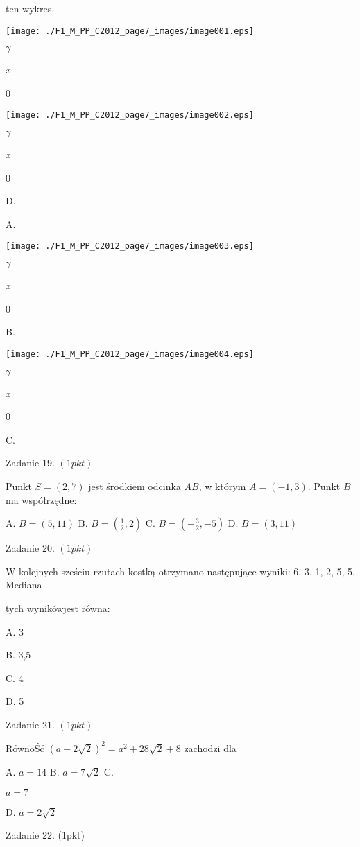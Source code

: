 \documentclass[a4paper,12pt]{article}
\begin{document}
ten wykres.
\begin{center}
\texttt{[image: ./F1\_M\_PP\_C2012\_page7\_images/image001.eps]}
\end{center}
$\gamma$

{\it x}

0
\begin{center}
\texttt{[image: ./F1\_M\_PP\_C2012\_page7\_images/image002.eps]}
\end{center}
$\gamma$

{\it x}

0

D.

A.
\begin{center}
\texttt{[image: ./F1\_M\_PP\_C2012\_page7\_images/image003.eps]}
\end{center}
$\gamma$

{\it x}

0

B.
\begin{center}
\texttt{[image: ./F1\_M\_PP\_C2012\_page7\_images/image004.eps]}
\end{center}
$\gamma$

{\it x}

0

C.

Zadanie 19. $(1pkt)$

Punkt $S=(2,7)$ jest środkiem odcinka $AB$, w którym $A=(-1,3)$. Punkt $B$ ma współrzędne:

A. $B=(5,11)$ B. $B=(\displaystyle \frac{1}{2},2)$ C. $B=(-\displaystyle \frac{3}{2},-5)$ D. $B=(3,11)$

Zadanie 20. $(1pkt)$

$\mathrm{W}$ kolejnych sześciu rzutach kostką otrzymano następujące wyniki: 6, 3, 1, 2, 5, 5. Mediana

tych wynikówjest równa:

A. 3

B. 3,5

C. 4

D. 5

Zadanie 21. $(1pkt)$

RównoŚć $(a+2\sqrt{2})^{2}=a^{2}+28\sqrt{2}+8$ zachodzi dla

A. $a=14$ B. $a=7\sqrt{2}$ C.

$a=7$

D. $a=2\sqrt{2}$

Zadanie 22. (1pkt)
\end{document}
